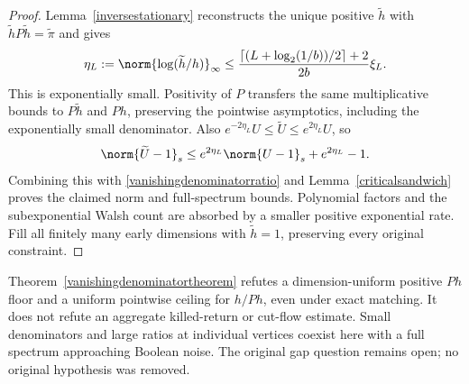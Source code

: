 \begin{proof}
Lemma~\ref{inversestationary} reconstructs the unique positive
$\widetilde h$ with $\widetilde hP\widetilde h=\widetilde\pi$ and gives
\[
 \eta_L:=\norm{\log(\widetilde h/h)}_\infty
 \leq\frac{\lceil(L+\log_2(1/b))/2\rceil+2}{2b}\xi_L.
\]
This is exponentially small. Positivity of $P$ transfers the same
multiplicative bounds to $P\widetilde h$ and $Ph$, preserving the
pointwise asymptotics, including the exponentially small denominator.
Also $e^{-2\eta_L}U\leq\widetilde U\leq e^{2\eta_L}U$, so
\[
 \norm{\widetilde U-1}_s
 \leq e^{2\eta_L}\norm{U-1}_s+e^{2\eta_L}-1.
\]
Combining this with \eqref{vanishingdenominatorratio} and
Lemma~\ref{criticalsandwich} proves the claimed norm and full-spectrum
bounds. Polynomial factors and the subexponential Walsh count are absorbed
by a smaller positive exponential rate. Fill all finitely many early
dimensions with $\widetilde h=1$, preserving every original constraint.
\end{proof}

Theorem~\ref{vanishingdenominatortheorem} refutes a dimension-uniform
positive $Ph$ floor and a uniform pointwise ceiling for $h/Ph$, even
under exact matching. It does not refute an aggregate killed-return or
cut-flow estimate. Small denominators and large ratios at individual
vertices coexist here with a full spectrum approaching Boolean noise.
The original gap question remains open; no original hypothesis was removed.
